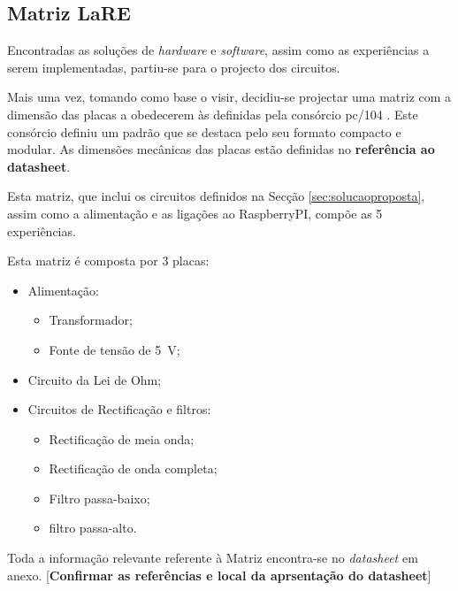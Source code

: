 

\subsection{Matriz LaRE}
Encontradas as soluções de \textit{hardware} e \textit{software}, assim como as experiências a serem implementadas, partiu-se para o projecto dos circuitos.

Mais uma vez, tomando como base o \acrshort{visir}, decidiu-se projectar uma matriz com a dimensão das placas a obedecerem às definidas pela consórcio \gls{pc/104} \cite{PC104}. Este consórcio definiu um padrão que se destaca pelo seu formato compacto e modular. As dimensões mecânicas das placas estão definidas no \textbf{referência ao datasheet}.

Esta matriz, que inclui os circuitos definidos na Secção \ref{sec:solucaoproposta}, assim como a alimentação e as ligações ao \gls{RaspberryPI}, compõe as 5 experiências.

Esta matriz é composta por 3 placas:
\begin{itemize}
    \item Alimentação:
          \begin{itemize}
              \item Transformador;
              \item Fonte de tensão de \SI{5}{\volt};
          \end{itemize}
    \item Circuito da Lei de Ohm;
    \item Circuitos de Rectificação e filtros:
          \begin{itemize}
              \item Rectificação de meia onda;
              \item Rectificação de onda completa;
              \item Filtro passa-baixo;
              \item filtro passa-alto.
          \end{itemize}
\end{itemize}



Toda a informação relevante referente à Matriz encontra-se no \textit{datasheet} em anexo. [\textbf{Confirmar as referências e local da aprsentação do datasheet}]

